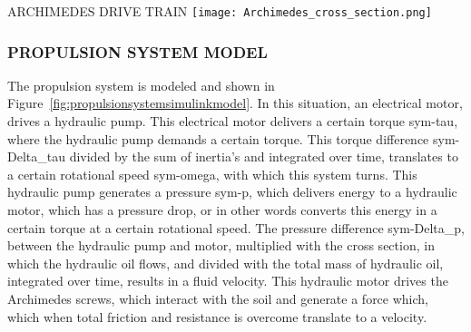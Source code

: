 \begin{RoyalFigure}[!htb, label=fig:pos_ball_kalman]{ARCHIMEDES DRIVE TRAIN}
	\texttt{[image: Archimedes\_cross\_section.png]}
\end{RoyalFigure}

\subsubsection{PROPULSION SYSTEM MODEL}

The propulsion system is modeled and shown in Figure~\ref{fig:propulsionsystemsimulinkmodel}. In this situation, an
electrical motor, drives a hydraulic pump. This electrical motor delivers a certain torque \gls{sym-tau}, where the
hydraulic pump demands a certain torque. This torque difference \gls{sym-Delta_tau} divided by the sum of inertia's and
integrated over time, translates to a certain rotational speed \gls{sym-omega}, with which this system turns. This
hydraulic pump generates a pressure \gls{sym-p}, which delivers energy to a hydraulic motor, which has a pressure drop,
or in other words converts this energy in a certain torque at a certain rotational speed. The pressure difference
\gls{sym-Delta_p}, between the hydraulic pump and motor, multiplied with the cross section, in which the hydraulic oil
flows, and divided with the total mass of hydraulic oil, integrated over time, results in a fluid velocity. This
hydraulic motor drives the Archimedes screws, which interact with the soil and generate a force which, which when total
friction and resistance is overcome translate to a velocity.

